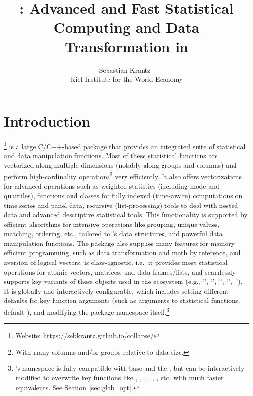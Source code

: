 \documentclass[article]{jss}
\author{Sebastian Krantz~\orcidlink{0000-0001-6212-5229}\\Kiel Institute for the World Economy}
\title{\proglang{collapse}: Advanced and Fast Statistical Computing and Data Transformation in \proglang{R}}
\newcommand{\class}[1]{`\code{#1}'}
\begin{document}


\section[Introduction]{Introduction} \label{sec:intro}
%
\href{https://sebkrantz.github.io/collapse/}{}\footnote{Website: https://sebkrantz.github.io/collapse/} is a large C/C++-based  package that provides an integrated suite of statistical and data manipulation functions. Most of these statistical functions are vectorized along multiple dimensions (notably along groups and columns) and perform high-cardinality operations\footnote{With many columns and/or groups relative to data size.} very efficiently. It also offers vectorizations for advanced operations such as weighted statistics (including mode and quantiles), functions and classes for fully indexed (time-aware) computations on time series and panel data, recursive (list-processing) tools to deal with nested data and advanced descriptive statistical tools. This functionality is supported by efficient algorithms for intensive operations like grouping, unique values, matching, ordering, etc., tailored to 's data structures, and powerful data manipulation functions. The package also supplies many features for memory efficient  programming, such as data transformation and math by reference, and aversion of logical vectors.  is class-agnostic, i.e., it provides most statistical operations for atomic vectors, matrices, and data frames/lists, and seamlessly supports key variants of these objects used in the  ecosystem (e.g., \class{tibble}, \class{data.table}, \class{sf}, \class{xts}, \class{pdata.frame}). It is globally and interactively configurable, which includes setting different defaults for key function arguments (such as  arguments to statistical functions, default ), and modifying the package namespace itself.\footnote{'s namespace is fully compatible with base  and the , but can be interactively modified to overwrite key functions like , , , , , ,  etc. with much faster  equivalents. See Section~\ref{sec:glob_opt}.} \newline
\end{document}
